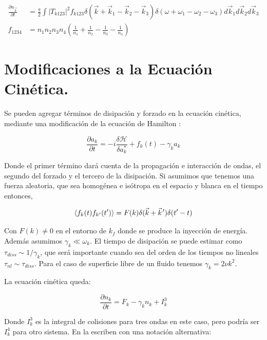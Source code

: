 \begin{equation}
	\begin{split}
		\frac{\partial n_{\vec k}}{\partial t} &= \frac{\pi}{2} \int |T_{k123}|^2 f_{k123} \delta(\vec k + \vec k_1 - \vec k_2 -\vec k_3) \delta(\omega + \omega_1 -\omega_2 - \omega_3) d\vec k_1 d\vec k_2 d\vec k_3 \\
		f_{1234} &= n_1n_2n_3n_4\left(\frac{1}{n_1} + \frac{1}{n_2} - \frac{1}{n_3} - \frac{1}{n_4} \right)
	\end{split}
\end{equation}


\section{Modificaciones a la Ecuación Cinética.}
Se pueden agregar términos de disipación y forzado en la ecuación cinética, mediante una modificación de la ecuación de Hamilton \cite{falkovichTurbulence2006, falconLaboratoryExperimentsWave2010}:

\begin{equation}
	\frac{\partial a_k}{\partial t} = -i\frac{\delta \mathcal{H}}{\delta a_k^*} + f_k(t) - \gamma_{k}a_k
\end{equation}

Donde el primer término dará cuenta de la propagación e interacción de ondas, el segundo del forzado y el tercero de la disipación. Si asumimos que tenemos una fuerza aleatoria, que sea homogénea e isótropa en el espacio y blanca en el tiempo entonces,

\begin{equation}
	\langle f_k(t)f_{k'}(t') \rangle = F(k) \delta(\vec k+ \pvec k')\delta(t'-t)
\end{equation}

Con $F(k)\neq 0$ en el entorno de $k_f$ donde se produce la inyección de energía. Además asumimos $\gamma_k\ll\omega_k$.  El tiempo de disipación se puede estimar como $\tau_{diss}\sim 1/\gamma_k $, que será importante cuando sea del orden de los tiempos no lineales $\tau_{nl}\sim \tau_{diss}$. Para el caso de superficie libre de un fluido tenemos $\gamma_k = 2\nu k^2$. \cite{deikeEtudesExperimentalesNumeriques2013}

La ecuación cinética queda:

\begin{equation}
	\frac{\partial n_k}{\partial t} = F_k - \gamma_k n_k + I_k^3  
\end{equation}

Donde $I^3_k$ es la integral de colisiones para tres ondas en este caso, pero podría ser $I_k^4$ para otro sistema. En \cite{falconLaboratoryExperimentsWave2010} la escriben con una notación alternativa:

